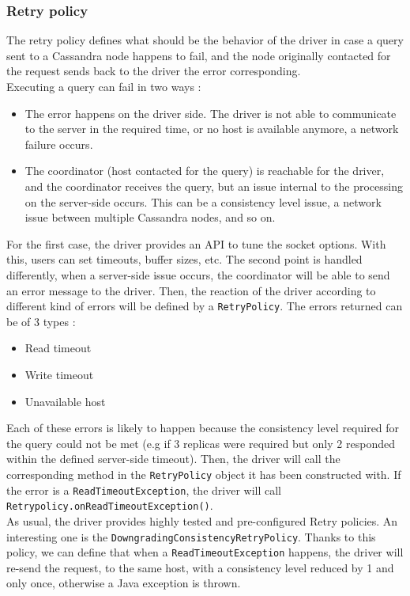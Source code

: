 \documentclass[a4paper]{report}
\begin{document}
\subsubsection{Retry policy}
The retry policy defines what should be the behavior of the driver in case a query sent to a Cassandra node happens to fail, and the node originally contacted for the request sends back to the driver the error corresponding.\\
Executing a query can fail in two ways : 
\begin{itemize}
   \item The error happens on the driver side. The driver is not able to communicate to the server in the required time, or no host is available anymore, a network failure occurs.
   \item The coordinator (host contacted for the query) is reachable for the driver, and the coordinator receives the query, but an issue internal to the processing on the server-side occurs. This can be a consistency level issue, a network issue between multiple Cassandra nodes, and so on.
\end{itemize}
For the first case, the driver provides an API to tune the socket options. With this, users can set timeouts, buffer sizes, etc.
The second point is handled differently, when a server-side issue occurs, the coordinator will be able to send an error message to the driver. Then, the reaction of the driver according to different kind of errors will be defined by a \verb;RetryPolicy;.
The errors returned can be of 3 types : 
\begin{itemize}
   \item Read timeout
   \item Write timeout
   \item Unavailable host
\end{itemize}
Each of these errors is likely to happen because the consistency level required for the query could not be met (e.g if 3 replicas were required but only 2 responded within the defined server-side timeout). Then, the driver will call the corresponding method in the \verb;RetryPolicy; object it has been constructed with. If the error is a \verb;ReadTimeoutException;, the driver will call \verb;Retrypolicy.onReadTimeoutException();.\\
As usual, the driver provides highly tested and pre-configured Retry policies. An interesting one is the \verb;DowngradingConsistencyRetryPolicy;. Thanks to this policy, we can define that when a \verb;ReadTimeoutException; happens, the driver will re-send the request, to the same host, with a consistency level reduced by 1 and only once, otherwise a Java exception is thrown.
\end{document}
